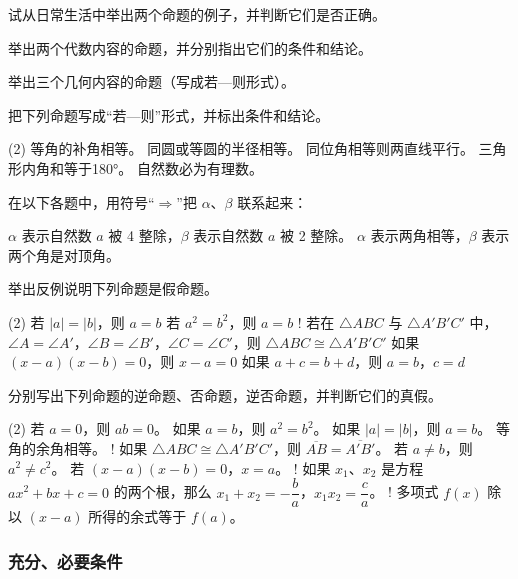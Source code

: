 \begin{Practice}
	\begin{question}
		\item 试从日常生活中举出两个命题的例子，并判断它们是否正确。
		\item 举出两个代数内容的命题，并分别指出它们的条件和结论。
		\item 举出三个几何内容的命题（写成若—则形式）。
		\item 把下列命题写成“若—则”形式，并标出条件和结论。
		\begin{tasks}(2)
			\task 等角的补角相等。
			\task 同圆或等圆的半径相等。
			\task 同位角相等则两直线平行。
			\task 三角形内角和等于\ang{180}。
			\task 自然数必为有理数。
		\end{tasks}
		\item 在以下各题中，用符号“$\Rightarrow$”把 $\alpha$、$\beta$ 联系起来：
		\begin{tasks}
			\task $\alpha$ 表示自然数 $a$ 被 4 整除，$\beta$ 表示自然数 $a$ 被 2 整除。
			\task $\alpha$ 表示两角相等，$\beta$ 表示两个角是对顶角。
		\end{tasks}
		\item 举出反例说明下列命题是假命题。
		\begin{tasks}(2)
			\task 若 $|a|=|b|$，则 $a=b$
			\task 若 $a^2=b^2$，则 $a=b$
			\task! 若在 $\triangle ABC$ 与 $\triangle A'B'C'$ 中，$\angle A=\angle A'$，$\angle B=\angle B'$，$\angle C=\angle C'$，则 $\triangle ABC\cong \triangle A'B'C'$
			\task 如果 $(x-a)(x-b)=0$，则 $x-a=0$
			\task 如果 $a+c=b+d$，则 $a=b$，$c=d$
		\end{tasks}
		\item 分别写出下列命题的逆命题、否命题，逆否命题，并判断它们的真假。
		\begin{tasks}(2)
			\task 若 $a=0$，则 $ab=0$。
			\task 如果 $a=b$，则 $a^2=b^2$。
			\task 如果 $|a|=|b|$，则 $a=b$。
			\task 等角的余角相等。
			\task! 如果 $\triangle ABC\cong \triangle A'B'C'$，则 $\overline{AB}=\overline{A'B'}$。
			\task 若 $a\ne b$，则 $a^2\ne c^2$。
			\task 若 $(x-a)(x-b)=0$，$x=a$。
			\task! 如果 $x_1$、$x_2$ 是方程 $ax^2+bx+c=0$ 的两个根，那么 $x_1+x_2=-\dfrac{b}{a}$，$x_1x_2=\dfrac{c}{a}$。
			\task! 多项式 $f(x)$ 除以 $(x-a)$ 所得的余式等于 $f(a)$。
		\end{tasks}
	\end{question}
\end{Practice}

\subsubsection{充分、必要条件}

